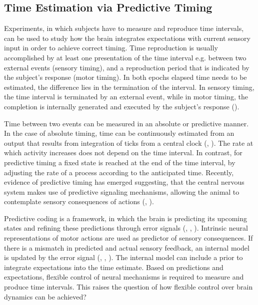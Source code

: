 \documentclass[10pt]{article}
\begin{document}
\subsection{Time Estimation via Predictive Timing}
Experiments, in which subjects have to measure and reproduce time intervals, can be used to study how the brain integrates expectations with current sensory input in order to achieve correct timing.
Time reproduction is usually accomplished by at least one presentation of the time interval e.g. between two external events (sensory timing), and a reproduction period that is indicated by the subject's response (motor timing).
In both epochs elapsed time needs to be estimated, the difference lies in the termination of the interval. In sensory timing, the time interval is terminated by an external event, while in motor timing, the completion is internally generated and executed by the subject's response (\cite{Grondin2010}).

Time between two events can be measured in an absolute or predictive manner. 
In the case of absolute timing, time can be continuously estimated from an output that results from integration of ticks from a central clock (\cite{Buhusi2005}, \cite{Paton2018}).
The rate at which activity increases does not depend on the time interval.
In contrast, for predictive timing a fixed state is reached at the end of the time interval, by adjusting the rate of a process according to the anticipated time.
Recently, evidence of predictive timing has emerged suggesting, that the central nervous system makes use of predictive signaling mechanisms, allowing the animal to contemplate sensory consequences of actions (\cite{Egger2019}, \cite{Meirhaeghe2021}).

Predictive coding is a framework, in which the brain is predicting its upcoming states and refining these predictions through error signals (\cite{Rao1999}, \cite{Huang2011}, \cite{Ficco2021}).
Intrinsic neural representations of motor actions are used as predictor of sensory consequences. %
If there is a mismatch in predicted and actual sensory feedback, an internal model is updated by the error signal (\cite{Straka2018}, \cite{Clark2013}, \cite{Bubic2010}). %
The internal model can include a prior to integrate expectations into the time estimate.
Based on predictions and expectations, flexible control of neural mechanisms is required to measure and produce time intervals.
This raises the question of how flexible control over brain dynamics can be achieved?
\end{document}
